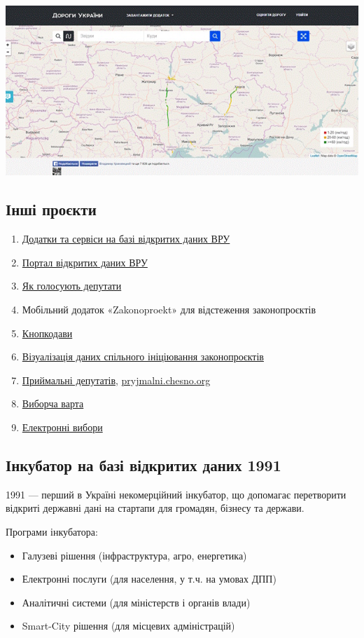 \includegraphics{images/031.jpg}

\subsection{Інші проєкти}

\begin{enumerate}
    \item \href{http://data.rada.gov.ua/open/main/apps}{Додатки та сервіси на базі відкритих даних ВРУ}
    \item \href{http://opendata.rada.gov.ua/}{Портал відкритих даних ВРУ}
    \item \href{http://rada4you.org}{Як голосують депутати}
    \item Мобільний додаток «Zakonoproekt» для відстеження законопроєктів
    \item \href{http://knopkodavy.chesno.org/}{Кнопкодави}
    \item \href{http://groups.chesno.org/}{Візуалізація даних спільного ініціювання законопроєктів}
    \item \href{https://rada.oporaua.org/map/}{Приймальні депутатів}, \href{https://pryjmalni.chesno.org}{pryjmalni.chesno.org}
    \item \href{http://openvote.in.ua/}{Виборча варта}
    \item \href{https://e-vybory.org/}{Електронні вибори}
\end{enumerate}

\subsection{Інкубатор на базі відкритих даних 1991}

1991 — перший в Україні некомерційний інкубатор, що допомагає перетворити відкриті державні дані на стартапи для громадян, бізнесу та держави.

Програми інкубатора:
\begin{itemize}
    \item Галузеві рішення (інфраструктура, агро, енергетика)
    \item Електронні послуги (для населення, у т.ч. на умовах ДПП)
    \item Аналітичні системи (для міністерств і органів влади)
    \item Smart-City рішення (для місцевих адміністрацій)
\end{itemize}
